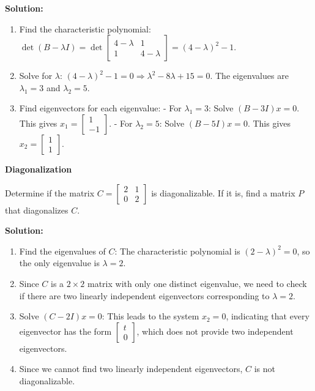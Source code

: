 \documentclass[8pt, a4paper, landscape]{extarticle}
\begin{document}
\begin{multicols*}{4}
  \textbf{Solution:}
  \begin{enumerate}
    \item Find the characteristic polynomial: $\det(B - \lambda I) = \det \begin{bmatrix} 4-\lambda & 1 \\ 1 & 4-\lambda \end{bmatrix} = (4-\lambda)^2 - 1$.
    \item Solve for $\lambda$: $(4-\lambda)^2 - 1 = 0 \Rightarrow \lambda^2 - 8\lambda + 15 = 0$. The eigenvalues are $\lambda_1 = 3$ and $\lambda_2 = 5$.
    \item Find eigenvectors for each eigenvalue:
          - For $\lambda_1 = 3$: Solve $(B - 3I)x = 0$. This gives $x_1 = \begin{bmatrix} 1 \\ -1 \end{bmatrix}$.
          - For $\lambda_2 = 5$: Solve $(B - 5I)x = 0$. This gives $x_2 = \begin{bmatrix} 1 \\ 1 \end{bmatrix}$.
  \end{enumerate}

  \textbf{Diagonalization}

  Determine if the matrix $C = \begin{bmatrix} 2 & 1 \\ 0 & 2 \end{bmatrix}$ is diagonalizable. If it is, find a matrix $P$ that diagonalizes $C$.

  \textbf{Solution:}
  \begin{enumerate}
    \item Find the eigenvalues of $C$: The characteristic polynomial is $(2 - \lambda)^2 = 0$, so the only eigenvalue is $\lambda = 2$.
    \item Since $C$ is a $2 \times 2$ matrix with only one distinct eigenvalue, we need to check if there are two linearly independent eigenvectors corresponding to $\lambda = 2$.
    \item Solve $(C - 2I)x = 0$: This leads to the system $x_2 = 0$, indicating that every eigenvector has the form $\begin{bmatrix} t \\ 0 \end{bmatrix}$, which does not provide two independent eigenvectors.
    \item Since we cannot find two linearly independent eigenvectors, $C$ is not diagonalizable.
  \end{enumerate}


\end{multicols*}
\end{document}
